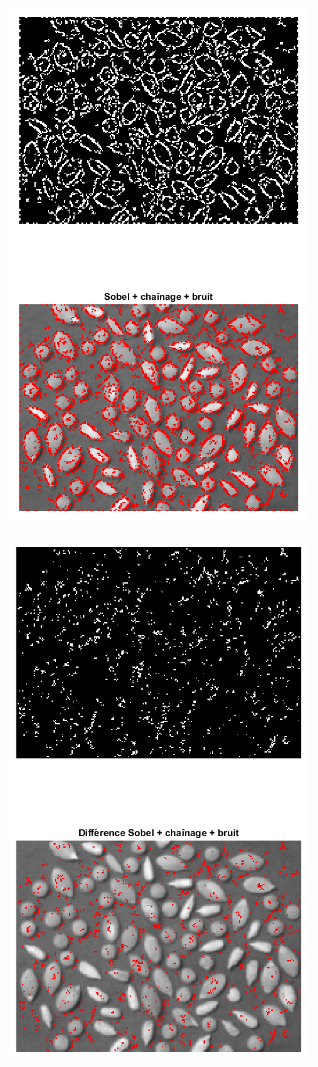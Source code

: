 \documentclass{article}
\begin{document}
\begin{itemize}[leftmargin=*]
\begin{itemize}[leftmargin=*]
\begin{minipage}[c]{0.46\linewidth}		
	\includegraphics[width=8cm]{Sobel_link_noise10.png}
\end{minipage}\hfill
\begin{minipage}[c]{0.46\linewidth}
	\includegraphics[width=8cm]{Diff_Sobel_link_noise10.png}
\end{minipage}\hfill


\end{itemize}
\end{itemize}
\end{document}
